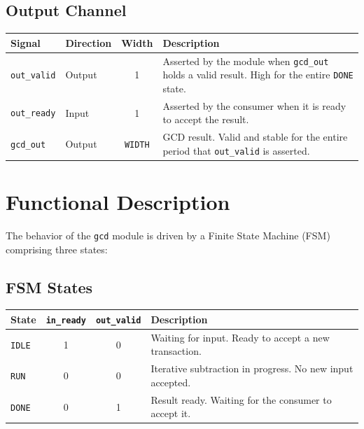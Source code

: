 \subsection*{Output Channel}
\begin{table}[H]
    \centering
    \begin{tabularx}{\textwidth}{l l c X}
        \toprule
        \textbf{Signal} & \textbf{Direction} & \textbf{Width} & \textbf{Description} \\
        \midrule
        \texttt{out\_valid} & Output & 1 & Asserted by the module when \texttt{gcd\_out} holds a valid result. High for the entire \texttt{DONE} state. \\
        \texttt{out\_ready} & Input & 1 & Asserted by the consumer when it is ready to accept the result. \\
        \texttt{gcd\_out} & Output & \texttt{WIDTH} & GCD result. Valid and stable for the entire period that \texttt{out\_valid} is asserted. \\
        \bottomrule
    \end{tabularx}
\end{table}

\section{Functional Description}
The behavior of the \texttt{gcd} module is driven by a Finite State Machine (FSM) comprising three states:

\subsection*{FSM States}
\begin{table}[H]
    \centering
    \begin{tabularx}{\textwidth}{l c c X}
        \toprule
        \textbf{State} & \textbf{\texttt{in\_ready}} & \textbf{\texttt{out\_valid}} & \textbf{Description} \\
        \midrule
        \texttt{IDLE} & 1 & 0 & Waiting for input. Ready to accept a new transaction. \\
        \texttt{RUN}  & 0 & 0 & Iterative subtraction in progress. No new input accepted. \\
        \texttt{DONE} & 0 & 1 & Result ready. Waiting for the consumer to accept it. \\
        \bottomrule
    \end{tabularx}
\end{table}

